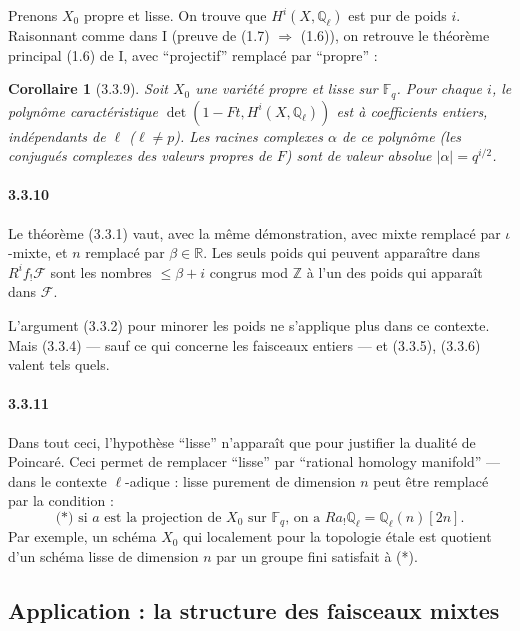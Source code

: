 \documentclass[12pt,a4paper]{article}
\theoremstyle{plain}
\newtheorem{corollary}[theorem]{Corollaire}
\theoremstyle{definition}
\theoremstyle{remark}
\newcommand{\FF}{{\mathbb{F}}}
\newcommand{\QQ}{{\mathbb{Q}}}
\newcommand{\RR}{{\mathbb{R}}}
\newcommand{\ZZ}{{\mathbb{Z}}}
\begin{document}
Prenons $X_0$ propre et lisse. On trouve que $H^i(X, \QQ_\ell)$ est pur de poids $i$. Raisonnant comme dans I (preuve de (1.7) $\Rightarrow$ (1.6)), on retrouve le th\'eor\`eme principal (1.6) de I, avec ``projectif'' remplac\'e par ``propre'' :

\begin{corollary}[3.3.9]
Soit $X_0$ une vari\'et\'e propre et lisse sur $\FF_q$. Pour chaque $i$, le polyn\^ome caract\'eristique $\det(1 - Ft, H^i(X, \QQ_\ell))$ est \`a coefficients entiers, ind\'ependants de $\ell$ ($\ell \neq p$). Les racines complexes $\alpha$ de ce polyn\^ome (les conjugu\'es complexes des valeurs propres de $F$) sont de valeur absolue $|\alpha| = q^{i/2}$.
\end{corollary}

\paragraph{3.3.10}
Le th\'eor\`eme (3.3.1) vaut, avec la m\^eme d\'emonstration, avec mixte remplac\'e par $\iota$-mixte, et $n$ remplac\'e par $\beta \in \RR$. Les seuls poids qui peuvent appara\^itre dans $R^i f_! \mathscr{F}$ sont les nombres $\leq \beta + i$ congrus mod $\ZZ$ \`a l'un des poids qui appara\^it dans $\mathscr{F}$.

L'argument (3.3.2) pour minorer les poids ne s'applique plus dans ce contexte. Mais (3.3.4) --- sauf ce qui concerne les faisceaux entiers --- et (3.3.5), (3.3.6) valent tels quels.


\paragraph{3.3.11}
Dans tout ceci, l'hypoth\`ese ``lisse'' n'appara\^it que pour justifier la dualit\'e de Poincar\'e. Ceci permet de remplacer ``lisse'' par ``rational homology manifold'' --- dans le contexte $\ell$-adique : lisse purement de dimension $n$ peut \^etre remplac\'e par la condition :
\begin{equation}\label{eq:3.3.11.1}
\text{(*) si $a$ est la projection de $X_0$ sur $\FF_q$, on a $Ra_! \QQ_\ell = \QQ_\ell(n)[2n]$.}
\end{equation}
Par exemple, un sch\'ema $X_0$ qui localement pour la topologie \'etale est quotient d'un sch\'ema lisse de dimension $n$ par un groupe fini satisfait \`a (*).


\subsection{Application : la structure des faisceaux mixtes}
\end{document}
